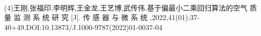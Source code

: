 \documentclass[preview]{standalone}
\begin{document}
\begin{center}
\quad\\(4)王刚,张福印,李明辉,王金龙,王艺博,武传伟.基于偏最小二乘回归算法的空气 质 量 监 测 系 统 研 究 [J]. 传 感 器 与 微 系 统 ,2022,41(01):37-40+49.DOI:10.13873/J.1000-9787(2022)01-0037-04\quad\\
\end{center}
\end{document}
